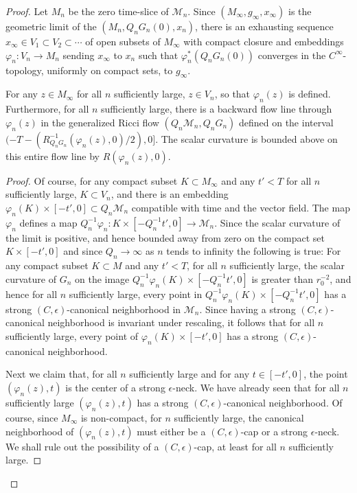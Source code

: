 \begin{proof}
Let $M_n$ be the zero time-slice of ${\mathcal M}_n$. Since
$(M_\infty,g_\infty,x_\infty)$ is the geometric limit of the
$(M_n,Q_nG_n(0),x_n)$, there is an exhausting sequence $x_\infty\in
V_1\subset V_2\subset\cdots$ of open subsets of $M_\infty$ with
compact closure and embeddings $\varphi_n\colon V_n\to M_n$ sending
$x_\infty$ to $x_n$ such that $\varphi_n^*(Q_nG_n(0))$ converges in
the $C^\infty$-topology, uniformly on compact sets, to $g_\infty$.

\begin{claim}
\label{claim:backward-flow-line-curvature-bound}
For any $z\in M_\infty$ for all $n$ sufficiently large, $z\in V_n$,
so that $\varphi_n(z)$ is defined. Furthermore, for all $n$
sufficiently large, there is a backward flow line through
$\varphi_n(z)$ in the generalized Ricci flow $(Q_n{\mathcal
M}_n,Q_nG_n)$ defined on the interval
$(-T-(R_{Q_nG_n}^{-1}(\varphi_n(z),0)/2),0]$. The scalar curvature
is bounded above on this entire flow line by $R(\varphi_n(z),0)$.
\end{claim}


\begin{proof}
Of course, for any compact subset $K\subset M_\infty$ and any $t'<T$
for all $n$ sufficiently large, $K\subset V_n$, and there is an
embedding $\varphi_n(K)\times [-t',0]\subset Q_n{\mathcal M}_n$
compatible with time and the vector field. The map $\varphi_n$
defines a map $Q_n^{-1}\varphi_n\colon K\times [-Q_n^{-1}t',0]\to
{\mathcal M}_n$. Since the scalar curvature of the limit is
positive, and hence bounded away from zero on the compact set
$K\times [-t',0]$ and since $Q_n\rightarrow \infty$ as $n$ tends to
infinity the following is true: For any compact subset $K\subset M$
and any $t'<T$, for all $n$ sufficiently large, the scalar curvature
of $G_n$ on the image $Q_n^{-1}\varphi_n(K)\times [-Q_n^{-1}t',0]$
is greater than $r_0^{-2}$, and hence for all $n$ sufficiently
large, every point in $Q_n^{-1}\varphi_n(K)\times [-Q_n^{-1}t',0]$
has a strong $(C,\epsilon)$-canonical neighborhood in ${\mathcal
M}_n$. Since having a strong $(C,\epsilon)$-canonical neighborhood
is invariant under rescaling, it follows that for all $n$
sufficiently large, every point of $\varphi_n(K)\times [-t',0]$ has
a strong $(C,\epsilon)$-canonical neighborhood.

Next we claim that, for all $n$ sufficiently large and for any $t\in
[-t',0]$, the point $(\varphi_n(z),t)$ is the center of a strong
$\epsilon$-neck. We have already seen that for all $n$ sufficiently
large $(\varphi_n(z),t)$ has a strong $(C,\epsilon)$-canonical
neighborhood. Of course, since $M_\infty$ is non-compact, for $n$
sufficiently large, the canonical neighborhood of $(\varphi_n(z),t)$
must either be a $(C,\epsilon)$-cap or a strong $\epsilon$-neck. We
shall rule out the possibility of a $(C,\epsilon)$-cap, at least for
all $n$ sufficiently large.


\end{proof}
\end{proof}
